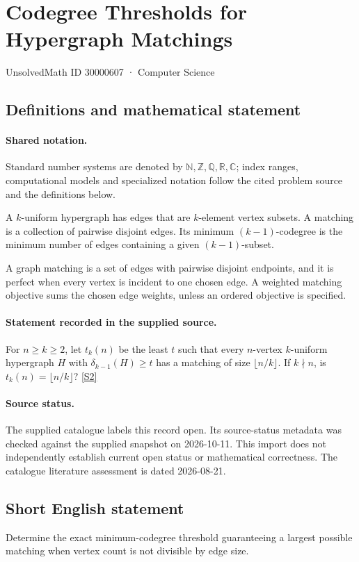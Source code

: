 \documentclass[11pt]{article}
\newcommand{\sref}[2]{\hyperlink{source:#1:#2}{[S#2]}}
\begin{document}
\setcounter{section}{30000606}
\section{Codegree Thresholds for Hypergraph Matchings}\label{30000607}
{\small\sffamily UnsolvedMath ID 30000607 · Computer Science}
\subsection{Definitions and mathematical statement}

\paragraph{Shared notation.}Standard number systems are denoted by $\mathbb N,\mathbb Z,\mathbb Q,\mathbb R,\mathbb C$; index ranges, computational models and specialized notation follow the cited problem source and the definitions below.


A $k$-uniform hypergraph has edges that are $k$-element vertex subsets. A matching is a collection of pairwise disjoint edges. Its minimum $(k-1)$-codegree is the minimum number of edges containing a given $(k-1)$-subset.

A graph matching is a set of edges with pairwise disjoint endpoints, and it is perfect when every vertex is incident to one chosen edge. A weighted matching objective sums the chosen edge weights, unless an ordered objective is specified.
\paragraph{Statement recorded in the supplied source.}
For $n\geq k\geq2$, let $t_k(n)$ be the least $t$ such that every $n$-vertex $k$-uniform hypergraph $H$ with $\delta_{k-1}(H)\geq t$ has a matching of size $\lfloor n/k\rfloor$. If $k\nmid n$, is $t_k(n)=\lfloor n/k\rfloor$? \sref{30000607}{2}
\paragraph{Source status.}
The supplied catalogue labels this record open. Its source-status metadata was checked against the supplied snapshot on 2026-10-11. This import does not independently establish current open status or mathematical correctness. The catalogue literature assessment is dated 2026-08-21.
\subsection{Short English statement}
Determine the exact minimum-codegree threshold guaranteeing a largest possible matching when vertex count is not divisible by edge size.
\end{document}
